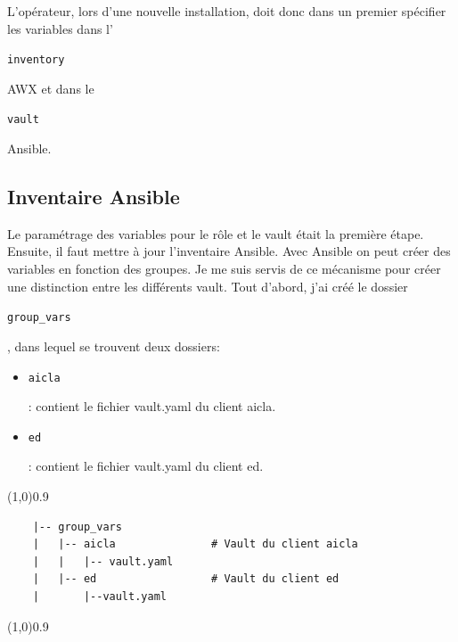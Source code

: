\documentclass[12pt, a4paper, twoside]{article}
\begin{document}
L'opérateur, lors d'une nouvelle installation, doit donc dans un premier spécifier les variables dans l'\begin{code}\texttt{inventory}\end{code} AWX et dans le \begin{code}\texttt{vault}\end{code}  \gls{Ansible}.

\newpage
\subsection{Inventaire Ansible}
Le paramétrage des variables pour le rôle et le vault était la première étape. 
Ensuite, il faut mettre à jour l'inventaire \gls{Ansible}.
Avec \gls{Ansible} on peut créer des variables en fonction des groupes.
Je me suis servis de ce mécanisme pour créer une distinction entre les différents vault.
Tout d'abord, j'ai créé le dossier \begin{code}\texttt{group\_vars}\end{code}, dans lequel se trouvent deux dossiers:
\begin{itemize}
    \item  \begin{code}\texttt{aicla}\end{code}: contient le fichier vault.yaml du client aicla.
    \item  \begin{code}\texttt{ed}\end{code}: contient le fichier vault.yaml du client ed.
\end{itemize}

\vspace{-1ex}
\begin{code}
\vspace{-1ex}
\begin{center} 
    \line(1,0){0.9\textwidth} 
\end{center}
\vspace{-1ex}
\begin{verbatim}
    |-- group_vars
    |   |-- aicla               # Vault du client aicla
    |   |   |-- vault.yaml
    |   |-- ed                  # Vault du client ed
    |       |--vault.yaml
\end{verbatim}
\vspace{-1ex}
\begin{center} 
    \line(1,0){0.9\textwidth} 
\end{center}
\vspace{-1ex}
\end{code}
\end{document}
